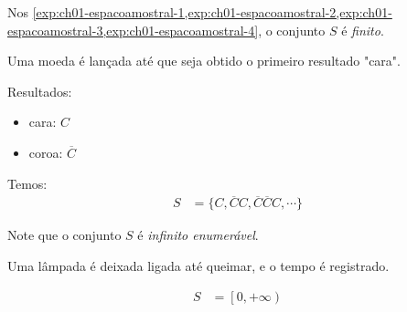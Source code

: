 \begin{obs}
    Nos \cref{exp:ch01-espacoamostral-1,exp:ch01-espacoamostral-2,exp:ch01-espacoamostral-3,exp:ch01-espacoamostral-4}, o conjunto $S$ é \textit{finito}.
\end{obs}

\begin{example}\label{exp:ch01-espacoamostral-5}
    Uma moeda é lançada até que seja obtido o primeiro resultado "cara".
    
    Resultados: \begin{itemize}
        \item cara: $C$
        \item coroa: $\overline{C}$
    \end{itemize}
    
    Temos: \begin{align*}
        S &= \{C, \overline{C}C, \overline{C}\overline{C}C, \cdots \}
    \end{align*}

    \begin{obs}
        Note que o conjunto $S$ é \textit{infinito enumerável}.
    \end{obs}
\end{example}

\begin{example}\label{exp:ch01-espacoamostral-6}
    Uma lâmpada é deixada ligada até queimar, e o tempo é registrado.

    \begin{align*}
        S &= \left[0, +\infty\right)
    \end{align*}
\end{example}

